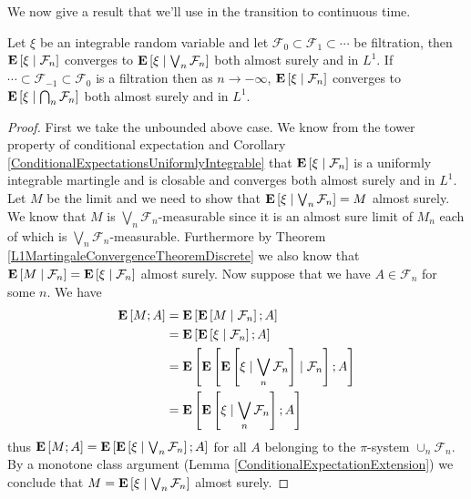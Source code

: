 We now give a result that we'll use in the transition to continuous
time.
\begin{thm}\label{JessenConditioningLimits}Let $\xi$ be an integrable
  random variable and let $\mathcal{F}_0 \subset \mathcal{F}_1 \subset
  \cdots$ be filtration, then $\cexpectationlong{\mathcal{F}_n}{\xi}$
  converges to $\cexpectationlong{\bigvee_n \mathcal{F}_n}{\xi}$ both
  almost surely and in $L^1$.  If $\dotsb \subset \mathcal{F}_{-1}
  \subset \mathcal{F}_0$ is a filtration then as $n \to -\infty$,
  $\cexpectationlong{\mathcal{F}_n}{\xi}$ converges to $\cexpectationlong{\bigcap_n \mathcal{F}_n}{\xi}$
both  almost surely and in $L^1$.
\end{thm}
\begin{proof}
First we take the unbounded above case.  We know from the tower property of conditional expectation and
Corollary \ref{ConditionalExpectationsUniformlyIntegrable} that $\cexpectationlong{\mathcal{F}_n}{\xi}$ is a
uniformly integrable martingle and is closable and converges both
almost surely and in $L^1$.  Let $M$ be the limit and we need to show
that $\cexpectationlong{\bigvee_n \mathcal{F}_n}{\xi} = M$ almost
surely.  We know that $M$ is $\bigvee_n \mathcal{F}_n$-measurable since it is an
almost sure limit of $M_n$ each of which is $\bigvee_n
\mathcal{F}_n$-measurable.  Furthermore by Theorem
\ref{L1MartingaleConvergenceTheoremDiscrete} we also know that
$\cexpectationlong{\mathcal{F}_n}{M} =
\cexpectationlong{\mathcal{F}_n}{\xi}$ almost surely.  Now suppose
that we have $A \in \mathcal{F}_n$ for some $n$.  We have
\begin{align*}
\expectation{M ; A} &=
\expectation{\cexpectationlong{\mathcal{F}_n}{M} ; A} \\
&=\expectation{\cexpectationlong{\mathcal{F}_n}{\xi} ; A} \\
&=\expectation{\cexpectationlong{\mathcal{F}_n}{\cexpectationlong{\bigvee_n
      \mathcal{F}_n}{\xi}} ; A} \\
&=\expectation{\cexpectationlong{\bigvee_n
      \mathcal{F}_n}{\xi} ; A} \\
\end{align*}
thus $\expectation{M ; A}  = \expectation{\cexpectationlong{\bigvee_n
    \mathcal{F}_n}{\xi} ; A}$ for all $A$ belonging to the
$\pi$-system $\cup_n \mathcal{F}_n$.  By a monotone class argument
(Lemma \ref{ConditionalExpectationExtension}) we conclude that $M = \cexpectationlong{\bigvee_n
    \mathcal{F}_n}{\xi}$ almost surely.


\end{proof}
